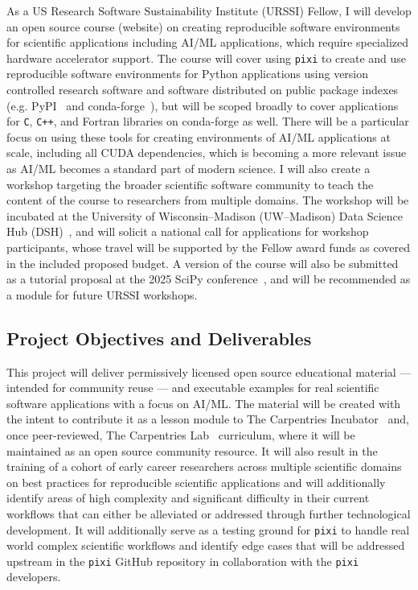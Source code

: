 \documentclass[letterpaper, 11pt]{article}
\newcommand{\institute}{UW--Madison}
\newcommand{\fullinstitute}{University of Wisconsin--Madison}
\newcommand{\fullprogram}{US Research Software Sustainability Institute}
\newcommand{\program}{URSSI}
\newcommand{\pixi}{\texttt{pixi}}
\begin{document}
As a \fullprogram{} (\program{}) Fellow, I will develop an open source course (website) on creating reproducible software environments for scientific applications including AI/ML applications, which require specialized hardware accelerator support.
The course will cover using \pixi{} to create and use reproducible software environments for Python applications using version controlled research software and software distributed on public package indexes (e.g. PyPI~\cite{PyPI_website} and conda-forge~\cite{conda-forge_community}), but will be scoped broadly to cover applications for \texttt{C}, \texttt{C++}, and Fortran libraries on conda-forge as well.
There will be a particular focus on using these tools for creating environments of AI/ML applications at scale, including all CUDA dependencies, which is becoming a more relevant issue as AI/ML becomes a standard part of modern science.
I will also create a workshop targeting the broader scientific software community to teach the content of the course to researchers from multiple domains.
The workshop will be incubated at the \fullinstitute{} (\institute{}) Data Science Hub (DSH)~\cite{data_science_hub}, and will solicit a national call for applications for workshop participants, whose travel will be supported by the Fellow award funds as covered in the included proposed budget.
A version of the course will also be submitted as a tutorial proposal at the 2025 SciPy conference~\cite{scipy-2025}, and will be recommended as a module for future URSSI workshops.
%

\subsection{Project Objectives and Deliverables}
This project will deliver permissively licensed open source educational material --- intended for community reuse --- and executable examples for real scientific software applications with a focus on AI/ML.
The material will be created with the intent to contribute it as a lesson module to The Carpentries Incubator~\cite{carpentries_incubator_proposals} and, once peer-reviewed, The Carpentries Lab~\cite{carpentries_lab} curriculum, where it will be maintained as an open source community resource.
It will also result in the training of a cohort of early career researchers across multiple scientific domains on best practices for reproducible scientific applications and will additionally identify areas of high complexity and significant difficulty in their current workflows that can either be alleviated or addressed through further technological development.
It will additionally serve as a testing ground for \pixi{} to handle real world complex scientific workflows and identify edge cases that will be addressed upstream in the \pixi{} GitHub repository in collaboration with the \pixi{} developers.
\end{document}
